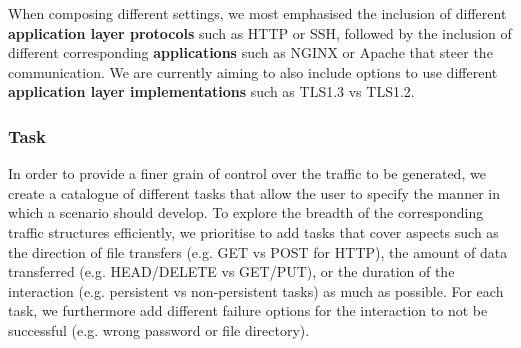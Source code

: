 \documentclass[runningheads]{llncs}
\begin{document}
When composing different settings, we most emphasised the inclusion of different \textbf{application layer protocols} such as HTTP or SSH, followed by the inclusion of different corresponding \textbf{applications} such as NGINX or Apache that steer the communication. We are currently aiming to also include options to use different \textbf{application layer implementations} such as TLS1.3 vs TLS1.2.

\subsubsection*{Task} \label{Sec:Subscenarios}

In order to provide a finer grain of control over the traffic to be generated, we create a catalogue of different tasks that allow the user to specify the manner in which a scenario should develop. %
To explore the breadth of the corresponding traffic structures efficiently, we prioritise to add tasks that cover aspects such as the direction of file transfers (e.g. GET vs POST for HTTP), the amount of data transferred (e.g. HEAD/DELETE vs GET/PUT), or the duration of the interaction (e.g. persistent vs non-persistent tasks) as much as possible. For each task, we furthermore add different failure options for the interaction to not be successful (e.g. wrong password or file directory). 



\end{document}
